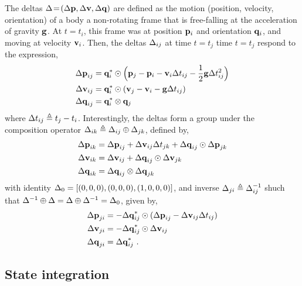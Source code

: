 The deltas $\Delta\!=\!({\Delta{\bf p}},{\Delta{\bf v}},{\Delta{\bf q}})$ are defined as the motion (position, velocity, orientation) of a body \wrt a non-rotating frame that is free-falling at the acceleration of gravity ${\bf g}$. At $t=t_i$, this frame was at position ${\bf p}_i$ and orientation ${\bf q}_i$, and moving at velocity ${\bf v}_i$. Then, the deltas $\Delta_{ij}$ at time $t=t_j$ \wrt time $t=t_j$ respond to the expression,
%
\begin{align}
\begin{split}
{\Delta{\bf p}}_{ij} &= {\bf q}_i^*\odot\Big({\bf p}_j - {\bf p}_i - {\bf v}_i\Delta t_{ij} - \frac12{\bf g}\Delta t_{ij}^2\Big) \\
{\Delta{\bf v}}_{ij} &= {\bf q}_i^*\odot({\bf v}_j - {\bf v}_i - {\bf g}\Delta t_{ij}) \\
{\Delta{\bf q}}_{ij} &= {\bf q}_i^*\otimes{\bf q}_j 
\end{split}
\end{align}
%
where $\Delta t_{ij} \triangleq t_j - t_i$. Interestingly, the deltas form a group under the composition operator $\Delta_{ik}\triangleq\Delta_{ij}\oplus\Delta_{jk}$, defined by,
%
\begin{align} \label{equ:g_composition}
\begin{split}
{\Delta{\bf p}}_{ik} 
&= {\Delta{\bf p}}_{ij} + {\Delta{\bf v}}_{ij}\Delta t_{jk} + {\Delta{\bf q}}_{ij}\odot{\Delta{\bf p}}_{jk} \\
{\Delta{\bf v}}_{ik} 
&= {\Delta{\bf v}}_{ij} + {\Delta{\bf q}}_{ij}\odot{\Delta{\bf v}}_{jk} \\
{\Delta{\bf q}}_{ik} 
&= {\Delta{\bf q}}_{ij}\otimes{\Delta{\bf q}}_{jk} 
\end{split}
\end{align}
%
with identity $\Delta_0=[(0,0,0),(0,0,0),(1,0,0,0)]$, and inverse $\Delta_{ji}\triangleq\Delta_{ij}^{-1}$ shuch that $\Delta^{-1}\oplus\Delta=\Delta\oplus\Delta^{-1}=\Delta_0$, given by,
%
\begin{align}
\begin{split}
{\Delta{\bf p}}_{ji} 
&= -{\Delta{\bf q}}_{ij}^*\odot({\Delta{\bf p}}_{ij} - {\Delta{\bf v}}_{ij}\Delta t_{ij}) \\
{\Delta{\bf v}}_{ji} 
&= -{\Delta{\bf q}}_{ij}^*\odot{\Delta{\bf v}}_{ij} \\
{\Delta{\bf q}}_{ji} 
&= {\Delta{\bf q}}_{ij}^*
~.
\end{split}
\end{align}


\subsection{State integration}

